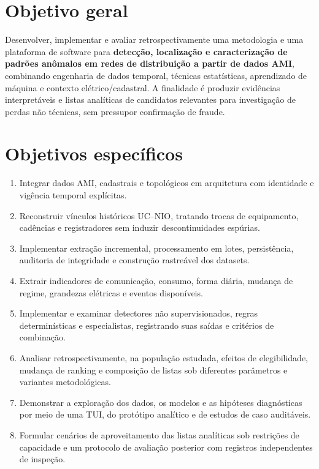 \section{Objetivo geral}\label{objetivo-geral}

Desenvolver, implementar e avaliar retrospectivamente uma metodologia e uma plataforma de software para \textbf{detecção, localização e caracterização de padrões anômalos em redes de distribuição a partir de dados AMI}, combinando engenharia de dados temporal, técnicas estatísticas, aprendizado de máquina e contexto elétrico/cadastral. A finalidade é produzir evidências interpretáveis e listas analíticas de candidatos relevantes para investigação de perdas não técnicas, sem pressupor confirmação de fraude.

\section{Objetivos específicos}\label{objetivos-especuxedficos}

\begin{enumerate}
\def\labelenumi{\arabic{enumi}.}
\tightlist
\item
  Integrar dados AMI, cadastrais e topológicos em arquitetura com identidade e vigência temporal explícitas.
\item
  Reconstruir vínculos históricos UC--NIO, tratando trocas de equipamento, cadências e registradores sem induzir descontinuidades espúrias.
\item
  Implementar extração incremental, processamento em lotes, persistência, auditoria de integridade e construção rastreável dos datasets.
\item
  Extrair indicadores de comunicação, consumo, forma diária, mudança de regime, grandezas elétricas e eventos disponíveis.
\item
  Implementar e examinar detectores não supervisionados, regras determinísticas e especialistas, registrando suas saídas e critérios de combinação.
\item
  Analisar retrospectivamente, na população estudada, efeitos de elegibilidade, mudança de ranking e composição de listas sob diferentes parâmetros e variantes metodológicas.
\item
  Demonstrar a exploração dos dados, os modelos e as hipóteses diagnósticas por meio de uma TUI, do protótipo analítico e de estudos de caso auditáveis.
\item
  Formular cenários de aproveitamento das listas analíticas sob restrições de capacidade e um protocolo de avaliação posterior com registros independentes de inspeção.
\end{enumerate}

